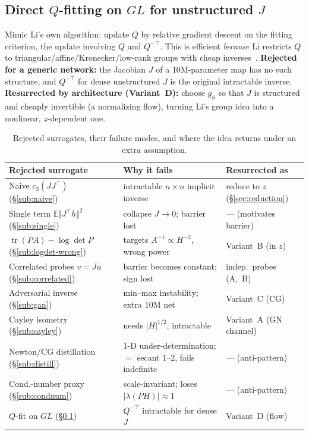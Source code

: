 \documentclass[11pt]{article}
\theoremstyle{plain}
\theoremstyle{definition}
\theoremstyle{remark}
\DeclareMathOperator{\tr}{tr}
\newcommand{\E}{\mathbb{E}}
\begin{document}
\subsection{Direct $Q$-fitting on $GL$ for unstructured $J$}
\label{sub:qfit}
Mimic Li's own algorithm: update $Q$ by relative gradient descent on the fitting criterion,
the update involving $Q$ and $Q^{-\top}$. This is efficient \emph{because} Li restricts $Q$
to triangular/affine/Kronecker/low-rank groups with cheap inverses~\cite{li2018,li2022,li2024}.
\textbf{Rejected for a generic network:} the Jacobian $J$ of a $10$M-parameter map has no
such structure, and $Q^{-\top}$ for dense unstructured $J$ is the original intractable
inverse. \textbf{Resurrected by architecture (Variant~D):} choose $g_\phi$ so that $J$ is
structured and cheaply invertible (a normalizing flow), turning Li's group idea into a
nonlinear, $z$-dependent one.

\begin{table}[t]
\centering
\small
\renewcommand{\arraystretch}{1.15}
\begin{tabular}{@{}p{4.4cm} p{6.6cm} p{3.4cm}@{}}
\toprule
Rejected surrogate & Why it fails & Resurrected as\\
\midrule
Naive $c_3(JJ^{\!\top})$ (\S\ref{sub:naive}) & intractable $n\times n$ implicit inverse & reduce to $z$ (\S\ref{sec:reduction})\\
Single term $\E\Vert J^{\!\top}h\Vert^2$ (\S\ref{sub:single}) & collapse $J\to0$; barrier lost & --- (motivates barrier)\\
$\tr(PA)-\log\det P$ (\S\ref{sub:logdet-wrong}) & targets $A^{-1}\!\propto\!H^{-2}$, wrong power & Variant~B (in $z$)\\
Correlated probes $v=Ju$ (\S\ref{sub:correlated}) & barrier becomes constant; sign lost & indep.\ probes (A,~B)\\
Adversarial inverse (\S\ref{sub:gan}) & min--max instability; extra $10$M net & Variant~C (CG)\\
Cayley isometry (\S\ref{sub:cayley}) & needs $|H|^{1/2}$, intractable & Variant~A (GN channel)\\
Newton/CG distillation (\S\ref{sub:distill}) & 1-D under-determination; $=$ secant 1--2, fails indefinite & --- (anti-pattern)\\
Cond.-number proxy (\S\ref{sub:condnum}) & scale-invariant; loses $|\lambda(PH)|\!\approx\!1$ & --- (anti-pattern)\\
$Q$-fit on $GL$ (\S\ref{sub:qfit}) & $Q^{-\top}$ intractable for dense $J$ & Variant~D (flow)\\
\bottomrule
\end{tabular}
\caption{Rejected surrogates, their failure modes, and where the idea returns under an
extra assumption.}
\label{tab:rejected}
\end{table}
\end{document}
